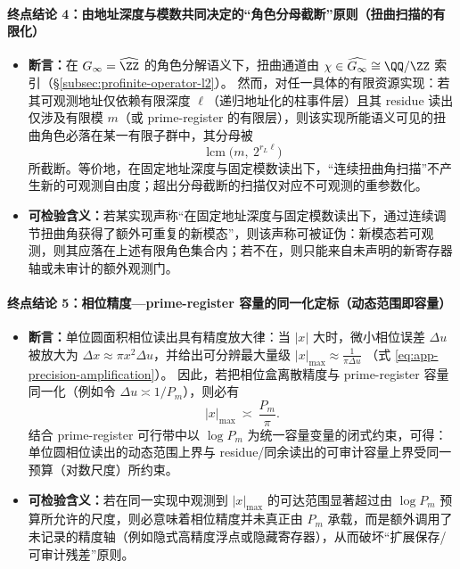 \paragraph{终点结论 4：由地址深度与模数共同决定的“角色分母截断”原则（扭曲扫描的有限化）}
\begin{itemize}
  \item \textbf{断言：}在 \(G_\infty=\widehat{\ZZ}\) 的角色分解语义下，扭曲通道由 \(\chi\in\widehat{G_\infty}\cong \QQ/\ZZ\) 索引（\S\ref{subsec:profinite-operator-l2}）。
  然而，对任一具体的有限资源实现：若其可观测地址仅依赖有限深度 \(\ell\)（递归地址化的柱事件层）且其 residue 读出仅涉及有限模 \(m\)（或 prime-register 的有限层），则该实现所能语义可见的扭曲角色必落在某一有限子群中，其分母被
  \[
  \operatorname{lcm}\!\bigl(m,\ 2^{r_L\ell}\bigr)
  \]
  所截断。等价地，在固定地址深度与固定模数读出下，“连续扭曲角扫描”不产生新的可观测自由度；超出分母截断的扫描仅对应不可观测的重参数化。
  \item \textbf{可检验含义：}若某实现声称“在固定地址深度与固定模数读出下，通过连续调节扭曲角获得了额外可重复的新模态”，则该声称可被证伪：新模态若可观测，则其应落在上述有限角色集合内；若不在，则只能来自未声明的新寄存器轴或未审计的额外观测门。
\end{itemize}

\paragraph{终点结论 5：相位精度—prime-register 容量的同一化定标（动态范围即容量）}
\begin{itemize}
  \item \textbf{断言：}单位圆面积相位读出具有精度放大律：当 \(|x|\) 大时，微小相位误差 \(\Delta u\) 被放大为 \(\Delta x\approx \pi x^2\Delta u\)，并给出可分辨最大量级
  \(
  |x|_{\max}\approx \frac{1}{\pi\Delta u}
  \)
  （式 \eqref{eq:app-precision-amplification}）。
  因此，若把相位盒离散精度与 prime-register 容量同一化（例如令 \(\Delta u\asymp 1/P_m\)），则必有
  \[
  |x|_{\max}\ \asymp\ \frac{P_m}{\pi}.
  \]
  结合 prime-register 可行带中以 \(\log P_m\) 为统一容量变量的闭式约束，可得：单位圆相位读出的动态范围上界与 residue/同余读出的可审计容量上界受同一预算（对数尺度）所约束。
  \item \textbf{可检验含义：}若在同一实现中观测到 \(|x|_{\max}\) 的可达范围显著超过由 \(\log P_m\) 预算所允许的尺度，则必意味着相位精度并未真正由 \(P_m\) 承载，而是额外调用了未记录的精度轴（例如隐式高精度浮点或隐藏寄存器），从而破坏“扩展保存/可审计残差”原则。
\end{itemize}

